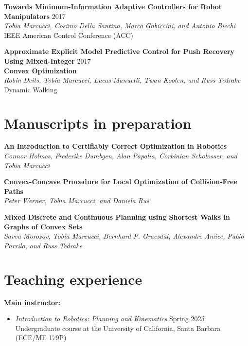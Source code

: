 \documentclass[11pt,a4paper,sans]{moderncv}
\begin{document}
\begin{enumerate}[label={[C\arabic*]}]
\item \textbf{Towards Minimum-Information Adaptive Controllers for Robot Manipulators} \hfill 2017 \\
\textit{Tobia Marcucci, Cosimo Della Santina, Marco Gabiccini, and Antonio Bicchi} \\
IEEE American Control Conference (ACC)
 
\item \textbf{Approximate Explicit Model Predictive Control for Push Recovery Using Mixed-Integer} \hfill 2017 \\ \textbf{Convex Optimization} \\
\textit{Robin Deits, Tobia Marcucci, Lucas Manuelli, Twan Koolen, and Russ Tedrake} \\
Dynamic Walking

\end{enumerate}


\section{Manuscripts in preparation}

\begin{enumerate}[label={[P\arabic*]}]

\item \textbf{An Introduction to Certifiably Correct Optimization in Robotics} \\
\textit{Connor Holmes, Frederike Dumbgen, Alan Papalia, Corbinian Scholosser, and Tobia Marcucci}

\item \textbf{Convex-Concave Procedure for Local Optimization of Collision-Free Paths} \\
\textit{Peter Werner, Tobia Marcucci, and Daniela Rus}

\item \textbf{Mixed Discrete and Continuous Planning using Shortest Walks in Graphs of Convex Sets} \\
\textit{Savva Morozov, Tobia Marcucci, Bernhard P. Graesdal, Alexandre Amice, Pablo Parrilo, and Russ Tedrake}

\end{enumerate}

\section{Teaching experience}

\textbf{Main instructor:}

\begin{itemize}
\item \textit{Introduction to Robotics: Planning and Kinematics} \hfill Spring 2025 \\
Undergraduate course at the University of California, Santa Barbara (ECE/ME 179P)
\end{itemize}
\end{document}
